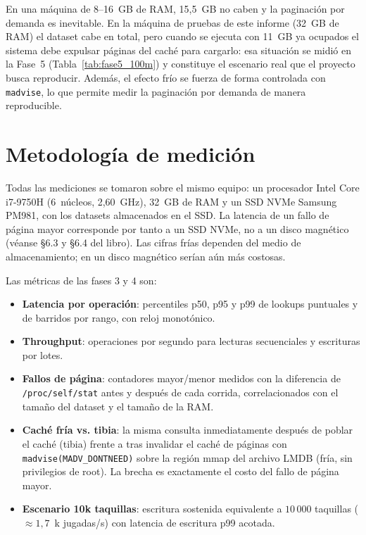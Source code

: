 \documentclass[12pt, letterpaper]{article}
\begin{document}
En una máquina de 8--16~GB de RAM, 15{,}5~GB no caben y la paginación por
demanda es inevitable. En la máquina de pruebas de este informe (32~GB de RAM)
el dataset cabe en total, pero cuando se ejecuta con 11~GB ya ocupados el
sistema debe expulsar páginas del caché para cargarlo: esa situación se midió
en la Fase~5 (Tabla~\ref{tab:fase5_100m}) y constituye el escenario real que el
proyecto busca reproducir. Además, el efecto frío se fuerza de forma controlada
con \texttt{madvise}, lo que permite medir la paginación por demanda de manera
reproducible.

\section{Metodología de medición}

Todas las mediciones se tomaron sobre el mismo equipo: un procesador Intel
Core i7-9750H (6~núcleos, 2,60~GHz), 32~GB de RAM y un SSD NVMe Samsung PM981,
con los datasets almacenados en el SSD. La latencia de un fallo de página mayor
corresponde por tanto a un SSD NVMe, no a un disco magnético (véanse §6.3 y
§6.4 del libro). Las cifras frías dependen del medio de almacenamiento; en un
disco magnético serían aún más costosas.

Las métricas de las fases 3 y 4 son:

\begin{itemize}
    \item \textbf{Latencia por operación}: percentiles p50, p95 y p99 de
    lookups puntuales y de barridos por rango, con reloj monotónico.
    \item \textbf{Throughput}: operaciones por segundo para lecturas
    secuenciales y escrituras por lotes.
    \item \textbf{Fallos de página}: contadores mayor/menor medidos con
    la diferencia de \texttt{/proc/self/stat} antes y después de cada
    corrida, correlacionados con el tamaño del dataset y el tamaño de la RAM.
    \item \textbf{Caché fría vs. tibia}: la misma consulta inmediatamente
    después de poblar el caché (tibia) frente a tras invalidar el caché de
    páginas con \texttt{madvise(MADV\_DONTNEED)} sobre la región mmap del
    archivo LMDB (fría, sin privilegios de root). La brecha es exactamente
    el costo del fallo de página mayor.
    \item \textbf{Escenario 10k taquillas}: escritura sostenida equivalente a
    $10\,000$ taquillas ($\approx 1{,}7$~k jugadas/s) con latencia de
    escritura p99 acotada.
\end{itemize}
\end{document}
